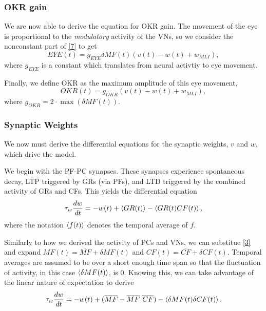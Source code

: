 \documentclass[10pt]{article}
\begin{document}
\subsubsection{OKR gain}

We are now able to derive the equation for OKR gain. The movement of the eye is proportional to the \textit{modulatory} activity of the VNs, so we consider the nonconstant part of \eqref{7} to get \begin{equation}
    \label{8}
    EYE(t) = g_{EYE}\delta MF(t)(v(t)-w(t)+w_{MLI}),
\end{equation}
where $g_{EYE}$ is a constant which translates from neural activtiy to eye movement.

Finally, we define OKR as the maximum amplitude of this eye movement, \begin{equation}
    \label{9}
    OKR(t) = g_{OKR}(v(t)-w(t)+w_{MLI}),
\end{equation}
where \(g_{OKR} = 2\cdot \max(\delta MF(t))\).

\subsubsection{Synaptic Weights}

We now must derive the differential equations for the synaptic weights, $v$ and $w$, which drive the model.

We begin with the PF-PC synapses. These synapses experience spontaneous decay, LTP triggered by GRs (via PFs), and LTD triggered by the combined activity of GRs and CFs. This yields the differential equation \begin{equation}
    \label{10}
    \tau_w \frac{dw}{dt} = -w(t) + \braket{GR(t)} - \braket{GR(t)CF(t)},
\end{equation} 
where the notation \(\braket{f(t)}\) denotes the temporal average of \(f\).

Similarly to how we derived the activity of PCs and VNs, we can substitue \eqref{3} and expand \(MF(t) = \overline{MF} + \delta MF(t)\) and \(CF(t) = \overline{CF} + \delta CF(t)\). Temporal averages are assumed to be over a short enough time span so that the fluctuation of activity, in this case \(\braket{\delta MF(t)}\), is 0. Knowing this, we can take advantage of the linear nature of expectation to derive
\begin{equation}
    \label{11}
    \tau_w \frac{dw}{dt} = -w(t) + (\overline{MF}-\overline{MF}\ \overline{CF}) - \braket{\delta MF(t) \delta CF(t)}.
\end{equation}
\end{document}
